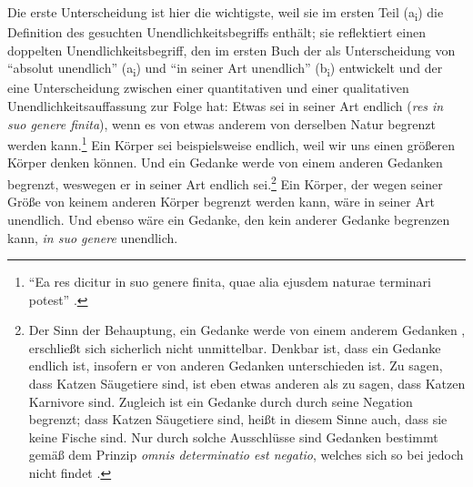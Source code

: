 Die erste Unterscheidung ist hier die wichtigste, weil sie im ersten
Teil (a\textsubscript{i}) die Definition des gesuchten Unendlichkeitsbegriffs enthält; sie reflektiert einen doppelten
Unendlichkeitsbegriff, den  im ersten Buch
der  als Unterscheidung von \enquote{absolut unendlich} (a\textsubscript{i}) und
\enquote{in seiner Art unendlich} (b\textsubscript{i}) entwickelt und der eine Unterscheidung
zwischen einer quantitativen und einer qualitativen Unendlichkeitsauffassung zur
Folge hat: Etwas sei in seiner Art endlich (\emph{res in suo genere finita}),
wenn es von etwas anderem von derselben Natur begrenzt werden
kann.\footnote{\enquote{Ea res dicitur in suo genere finita, quae alia ejusdem
naturae terminari potest} \parencite[][\nopp
1d2]{Spinoza:EthikingeometrischerOrdnungdargestellt2007}.}
Ein Körper sei beispielsweise endlich, weil wir uns einen größeren Körper denken
können. Und ein Gedanke werde von einem anderen Gedanken begrenzt,
weswegen er in seiner Art endlich sei.\footnote{Der Sinn der Behauptung, ein
Gedanke werde von einem anderem Gedanken , erschließt
sich sicherlich nicht unmittelbar. Denkbar ist, dass ein Gedanke endlich ist,
insofern er von anderen Gedanken unterschieden ist. Zu sagen, dass Katzen
Säugetiere sind, ist eben etwas anderen als zu sagen, dass Katzen Karnivore
sind. Zugleich ist ein Gedanke durch durch seine Negation begrenzt; dass Katzen
Säugetiere sind, heißt in diesem Sinne auch, dass sie keine Fische sind. Nur
durch solche Ausschlüsse sind Gedanken bestimmt gemäß dem Prinzip \emph{omnis
determinatio est negatio}, welches sich so bei
 jedoch nicht findet
\parencite[vgl.][\pno~50\,f.]{Schnepf:MetaphysikimerstenTeilderEthikSpinozas1996}.}
Ein Körper, der wegen seiner Größe von keinem anderen Körper begrenzt werden
kann, wäre in seiner Art unendlich. Und ebenso wäre ein Gedanke, den kein
anderer Gedanke begrenzen kann, \emph{in suo genere} unendlich.

